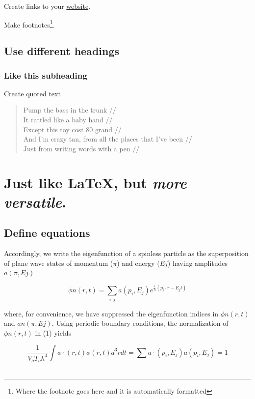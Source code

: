 \documentclass[10,portrait]{article}
\begin{document}
Create links to your \href{https://github.com/darwinanddavis}{website}.

Make footnotes\footnote{Where the footnote goes here and it is
  automatically formatted}.

\subsection{Use different headings}\label{use-different-headings}

\subsubsection{Like this subheading}\label{like-this-subheading}

Create quoted text

\begin{quote}
Pump the bass in the trunk //\\
It rattled like a baby hand //\\
Except this toy cost 80 grand //\\
And I'm crazy tan, from all the places that I've been //\\
Just from writing words with a pen //
\end{quote}

\section{\texorpdfstring{Just like \LaTeX{}, but \emph{more
versatile}.}{Just like , but more versatile.}}\label{just-like-but-more-versatile.}

\newpage     

\subsection{Define equations}\label{define-equations}

Accordingly, we write the eigenfunction of a spinless particle as the
superposition of plane wave states of momentum (\(\pi\)) and energy
(\(Ej\)) having amplitudes \(a(\pi,Ej)\)

\[  
\phi n(r,t) =  
\sum_{i, j} a(p_{i},E_{j})
e^{
\frac{i}
{h}
(p_{i} \cdot r - E_{j}t) 
}
\]

where, for convenience, we have suppressed the eigenfunction indices in
\(\phi n(r,t)\) and \(an(\pi,Ej)\). Using periodic boundary conditions,
the normalization of \(\phi n(r,t)\) in (1) yields

\[
\frac
{1}
{V_{o}T_{o}h^{4}}
\int \phi \cdot (r,t) \phi (r,t)d^{3}rdt = \sum a \cdot (p_{i},E_{j})a(p_{i},E_{j}) = 1  
\] ~ ~ ~ ~ ~
\end{document}
